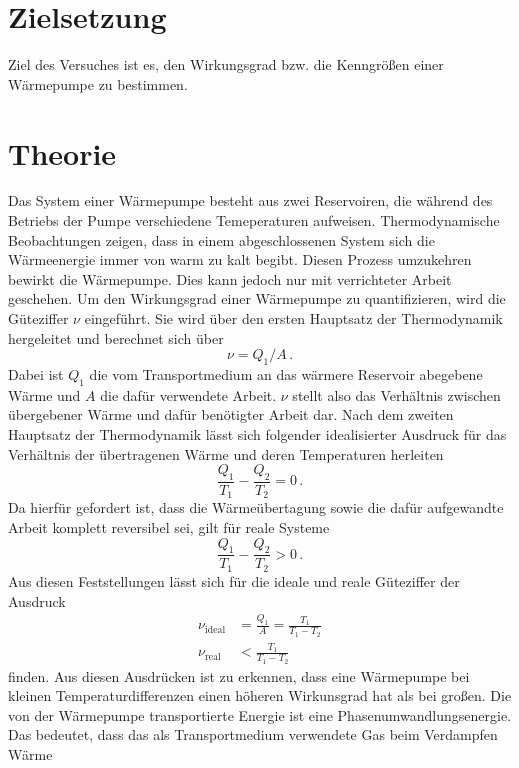 \section{Zielsetzung}
Ziel des Versuches ist es, den Wirkungsgrad bzw. die Kenngrößen 
einer Wärmepumpe zu bestimmen.
\section{Theorie}
\label{sec:Theorie}

Das System einer Wärmepumpe besteht aus zwei Reservoiren, die 
während des Betriebs der Pumpe verschiedene Temeperaturen aufweisen.
Thermodynamische Beobachtungen zeigen, dass in einem abgeschlossenen 
System sich die Wärmeenergie immer von warm zu kalt begibt. Diesen 
Prozess umzukehren bewirkt die Wärmepumpe. Dies kann jedoch nur mit 
verrichteter Arbeit geschehen. Um den Wirkungsgrad einer Wärmepumpe 
zu quantifizieren, wird die Güteziffer $\nu$ eingeführt. Sie wird 
über den ersten Hauptsatz der Thermodynamik hergeleitet und berechnet 
sich über 
\begin{equation}
    \nu=Q_1/A\,.
\end{equation}
Dabei ist $Q_1$ die vom Transportmedium an das wärmere Reservoir abegebene
Wärme und $A$ die dafür verwendete Arbeit. $\nu$ stellt also das Verhältnis 
zwischen übergebener Wärme und dafür benötigter Arbeit dar. Nach dem zweiten
Hauptsatz der Thermodynamik lässt sich folgender idealisierter Ausdruck für 
das Verhältnis der übertragenen Wärme und deren Temperaturen herleiten 
\begin{equation}
    \frac{Q_1}{T_1}-\frac{Q_2}{T_2}=0\,.
\end{equation}
Da hierfür gefordert ist, dass die Wärmeübertagung sowie die dafür aufgewandte
Arbeit komplett reversibel sei, gilt für reale Systeme 
\begin{equation}
    \frac{Q_1}{T_1}-\frac{Q_2}{T_2}>0\,.
\end{equation}
Aus diesen Feststellungen lässt sich für die ideale und reale Güteziffer der 
Ausdruck 
\begin{align}
    \nu_\text{ideal}&=\frac{Q_1}{A}=\frac{T_1}{T_1-T_2}\\
    \nu_\text{real}&<\frac{T_1}{T_1-T_2}
\end{align}
finden. Aus diesen Ausdrücken ist zu erkennen, dass eine Wärmepumpe bei kleinen 
Temperaturdifferenzen einen höheren Wirkunsgrad hat als bei großen.
Die von der Wärmepumpe transportierte Energie ist eine Phasenumwandlungsenergie. 
Das bedeutet, dass das als Transportmedium verwendete Gas beim Verdampfen Wärme 

